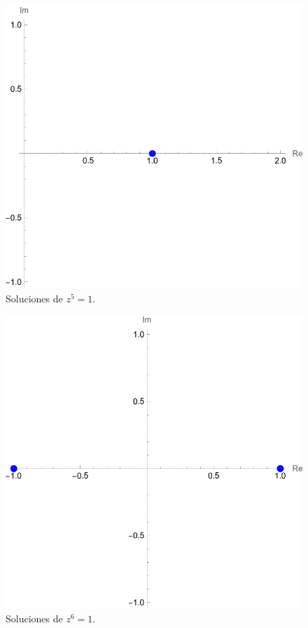 \documentclass[conference]{IEEEtran}
\begin{document}
\begin{figure}[H]
	\centering
	\includegraphics[scale=0.4]{./img/p14-4_f}
	\caption{Soluciones de $z^5 = 1$.}
\end{figure}


\begin{figure}[H]
	\centering
	\includegraphics[scale=0.4]{./img/p14-4_g}
	\caption{Soluciones de $z^6 = 1$.}
\end{figure}
\end{document}
